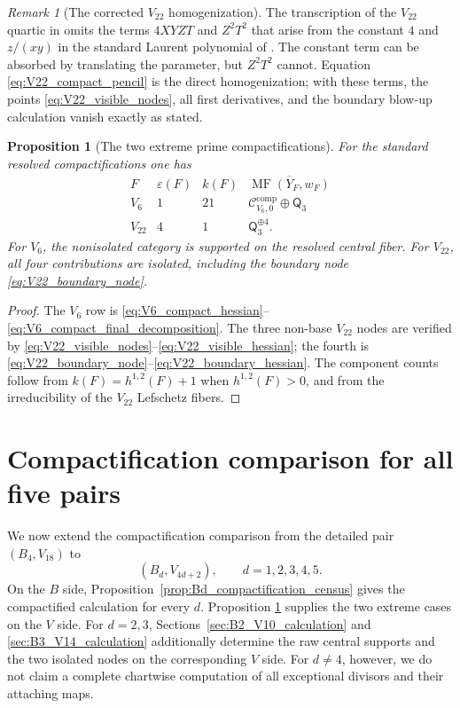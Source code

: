 \documentclass[11pt]{amsart}
\newtheorem{proposition}[theorem]{Proposition}
\theoremstyle{definition}
\theoremstyle{remark}
\newtheorem{remark}[theorem]{Remark}
\DeclareMathOperator{\MF}{MF}
\newcommand{\MorseCat}[1]{\mathsf{Q}_{#1}}
\newcommand{\CcompVsix}{\mathcal C^{\mathrm{comp}}_{V_6,0}}
\begin{document}
\begin{remark}[The corrected $V_{22}$ homogenization]
\label{rem:corrected_V22_homogenization}
The transcription of the $V_{22}$ quartic in
\cite{Przyjalkowski2026} omits the terms $4XYZT$ and $Z^2T^2$ that arise
from the constant $4$ and $z/(xy)$ in the standard Laurent polynomial of
\cite{PrzyjalkowskiWeak}.  The constant term can be absorbed by translating
the parameter, but $Z^2T^2$ cannot.  Equation
\eqref{eq:V22_compact_pencil} is the direct homogenization; with these terms,
the points \eqref{eq:V22_visible_nodes}, all first derivatives, and the
boundary blow-up calculation vanish exactly as stated.
\end{remark}

\begin{proposition}[The two extreme prime compactifications]
\label{prop:V6_V22_compactification_census}
For the standard resolved compactifications one has
\[
\begin{array}{c|c|c|c}
F & \varepsilon(F) & k(F) & \overline{\MF(Y_F,w_F)}\\
\hline
V_6 & 1 & 21 & \CcompVsix\oplus\MorseCat{3}\\
V_{22} & 4 & 1 & \MorseCat{3}^{\oplus4}.
\end{array}
\]
For $V_6$, the nonisolated category is supported on the resolved central
fiber.  For $V_{22}$, all four contributions are isolated, including the
boundary node \eqref{eq:V22_boundary_node}.
\end{proposition}

\begin{proof}
The $V_6$ row is
\eqref{eq:V6_compact_hessian}--\eqref{eq:V6_compact_final_decomposition}.
The three non-base $V_{22}$ nodes are verified by
\eqref{eq:V22_visible_nodes}--\eqref{eq:V22_visible_hessian}; the fourth is
\eqref{eq:V22_boundary_node}--\eqref{eq:V22_boundary_hessian}.  The component
counts follow from $k(F)=h^{1,2}(F)+1$ when $h^{1,2}(F)>0$, and from the
irreducibility of the $V_{22}$ Lefschetz fibers.
\end{proof}

\section{Compactification comparison for all five pairs}
\label{sec:five_pair_compactification}

We now extend the compactification comparison from the detailed pair
$(B_4,V_{18})$ to
\[
(B_d,V_{4d+2}),
\qquad d=1,2,3,4,5.
\]
On the $B$ side, Proposition~\ref{prop:Bd_compactification_census} gives the
compactified calculation for every $d$.  Proposition
\ref{prop:V6_V22_compactification_census} supplies the two extreme cases on
the $V$ side.  For $d=2,3$,
Sections~\ref{sec:B2_V10_calculation} and
\ref{sec:B3_V14_calculation} additionally determine the raw central supports
and the two isolated nodes on the corresponding $V$ side.  For $d\neq4$,
however, we do not claim a complete chartwise computation of all exceptional
divisors and their attaching maps.
\end{document}
